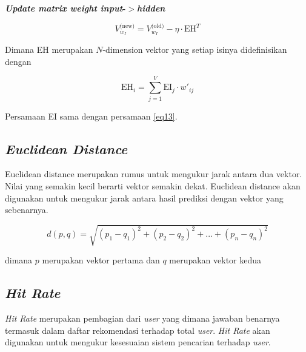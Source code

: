 \documentclass[12pt]{report}
\begin{document}
\begin{enumerate}
\textbf{\textit{Update matrix weight input}-$>$\textit{hidden}}

\begin{equation}
{V^{\text{(new)}}_{w_I}} = {V^{\text{(old)}}_{w_I}} - \eta \cdot \text{EH}^T \label{eq15}
\end{equation}

Dimana EH merupakan $N$-dimension vektor yang setiap isinya didefinisikan dengan

\begin{equation}
\text{EH}_i = \sum_{j=1}^V \text{EI}_j \cdot w'_{ij} \label{eq16}
\end{equation}

Persamaan EI sama dengan persamaan \eqref{eq13}.
\end{enumerate}



\subsection{\textit{Euclidean Distance}}
Euclidean distance merupakan rumus untuk mengukur jarak antara dua vektor. Nilai yang semakin kecil berarti vektor semakin dekat. Euclidean distance akan digunakan untuk mengukur jarak antara hasil prediksi dengan vektor yang sebenarnya.

\begin{equation}
d(p,q) = \sqrt{(p_1-q_1)^2 + (p_2-q_2)^2 + ... + (p_n-q_n)^2}
\end{equation}

dimana $p$ merupakan vektor pertama dan $q$ merupakan vektor kedua

\subsection{\textit{Hit Rate}}
\textit{Hit Rate} merupakan pembagian dari \textit{user} yang dimana jawaban benarnya termasuk dalam daftar rekomendasi terhadap total \textit{user}. \textit{Hit Rate} akan digunakan untuk mengukur kesesuaian sistem pencarian terhadap \textit{user}.
\end{document}
